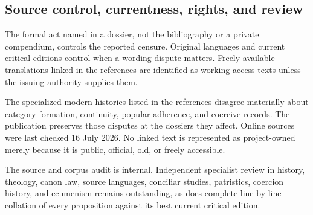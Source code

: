 {\subsection{Source control, currentness, rights, and review}

The formal act named in a dossier, not the bibliography or a private compendium, controls the reported censure. Original languages and current critical editions control when a wording dispute matters. Freely available translations linked in the references are identified as working access texts unless the issuing authority supplies them.

The specialized modern histories listed in the references disagree materially about category formation, continuity, popular adherence, and coercive records. The publication preserves those disputes at the dossiers they affect. Online sources were last checked 16 July 2026. No linked text is represented as project-owned merely because it is public, official, old, or freely accessible.

The source and corpus audit is internal. Independent specialist review in history, theology, canon law, source languages, conciliar studies, patristics, coercion history, and ecumenism remains outstanding, as does complete line-by-line collation of every proposition against its best current critical edition.
}
